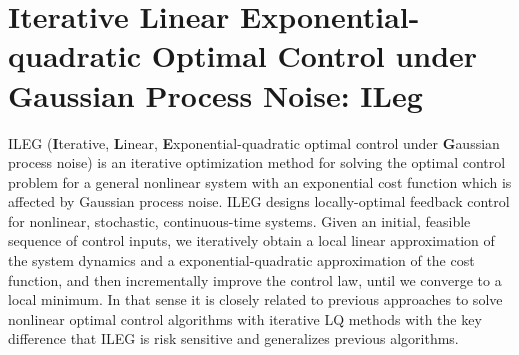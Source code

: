 \documentclass[letterpaper, 10 pt, conference]{ieeeconf}
\begin{document}
\section{Iterative Linear Exponential-quadratic Optimal Control under Gaussian Process Noise: ILeg} \label{sec:continuous_ILEQG}
ILEG (\textbf{I}terative, \textbf{L}inear, \textbf{E}xponential-quadratic optimal
control under \textbf{G}aussian process noise) is an iterative optimization
method for solving the optimal control problem for a general nonlinear system
with an exponential cost function which is affected by Gaussian process noise.
ILEG designs locally-optimal feedback control for nonlinear, stochastic,
continuous-time systems. Given an initial, feasible sequence of control inputs,
we iteratively obtain a local linear approximation of the system dynamics and a
exponential-quadratic approximation of the cost function, and then incrementally
improve the control law, until we converge to a local minimum. In that sense it
is closely related to previous approaches to solve nonlinear optimal control
algorithms with iterative LQ methods \cite{sideris05,todorov05} with the key
difference that ILEG is risk sensitive and generalizes previous algorithms.
\end{document}
